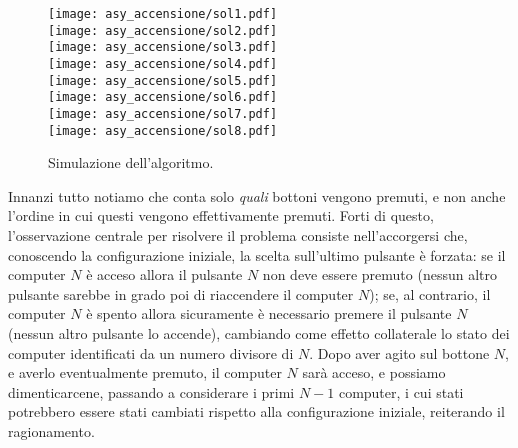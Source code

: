 \newpage
\setcounter{figure}{0}
\pagecolor{backcolor}
\Solution

\begin{wrapfigure}{r}{.35\textwidth}
  \vspace*{-.9cm}
  \begin{flushright}
		\texttt{[image: asy\_accensione/sol1.pdf]}\\[2.5mm]
		\texttt{[image: asy\_accensione/sol2.pdf]}\\[2.5mm]
		\texttt{[image: asy\_accensione/sol3.pdf]}\\[2.5mm]
		\texttt{[image: asy\_accensione/sol4.pdf]}\\[2.5mm]
		\texttt{[image: asy\_accensione/sol5.pdf]}\\[2.5mm]
		\texttt{[image: asy\_accensione/sol6.pdf]}\\[2.5mm]
		\texttt{[image: asy\_accensione/sol7.pdf]}\\[2.5mm]
		\texttt{[image: asy\_accensione/sol8.pdf]}\\
	\end{flushright}
	\vspace*{-.5cm}
	\caption{\small Simulazione dell'algoritmo.}
	\vspace*{-2cm}
\end{wrapfigure}
Innanzi tutto notiamo che conta solo \emph{quali} bottoni vengono premuti, e non anche l'ordine in cui questi vengono effettivamente premuti. Forti di questo, l'osservazione centrale per risolvere il problema consiste nell'accorgersi che, conoscendo la configurazione iniziale, la scelta sull'ultimo pulsante è forzata: se il computer $N$ è acceso allora il pulsante $N$ non deve essere premuto (nessun altro pulsante sarebbe in grado poi di riaccendere il computer $N$); se, al contrario, il computer $N$ è spento allora sicuramente è necessario premere il pulsante $N$ (nessun altro pulsante lo accende), cambiando come effetto collaterale lo stato dei computer identificati da un numero divisore di $N$. Dopo aver agito sul bottone $N$, e averlo eventualmente premuto, il computer $N$ sarà acceso, e possiamo dimenticarcene, passando a considerare i primi $N-1$ computer, i cui stati potrebbero essere stati cambiati rispetto alla configurazione iniziale, reiterando il ragionamento.

